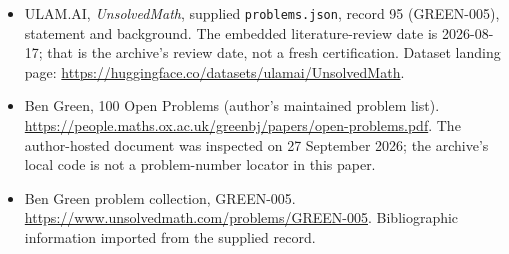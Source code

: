 \documentclass[11pt,a4paper]{article}
\begin{document}
{\small

\begin{itemize}

\item[\hypertarget{source:95:1}{S1}] ULAM.AI, \emph{UnsolvedMath}, supplied \texttt{problems.json}, record 95 (GREEN-005), statement and background. The embedded literature-review date is 2026-08-17; that is the archive’s review date, not a fresh certification. Dataset landing page: \url{https://huggingface.co/datasets/ulamai/UnsolvedMath}.

\item[\hypertarget{source:95:2}{S2}] Ben Green, 100 Open Problems (author’s maintained problem list). \url{https://people.maths.ox.ac.uk/greenbj/papers/open-problems.pdf}. The author-hosted document was inspected on 27 September 2026; the archive’s local code is not a problem-number locator in this paper.

\item[\hypertarget{source:95:3}{S3}] Ben Green problem collection, GREEN-005. \url{https://www.unsolvedmath.com/problems/GREEN-005}. Bibliographic information imported from the supplied record.

\end{itemize}

}

\label{end:95}
\end{document}
